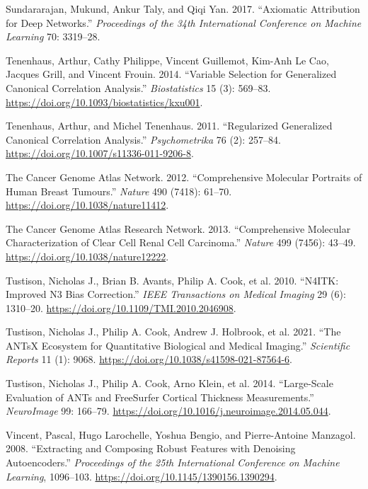 \documentclass[
  10pt,
  letterpaper,
]{report}
\newlength{\cslhangindent}
\newenvironment{CSLReferences}[2] %
 {\begin{list}{}{%
  \setlength{\itemindent}{0pt}
  \setlength{\leftmargin}{0pt}
  \setlength{\parsep}{0pt}
  \ifodd #1
   \setlength{\leftmargin}{\cslhangindent}
   \setlength{\itemindent}{-1\cslhangindent}
  \fi
  \setlength{\itemsep}{#2\baselineskip}}}
 {\end{list}}
\begin{document}
\begin{CSLReferences}{1}{1}
Sundararajan, Mukund, Ankur Taly, and Qiqi Yan. 2017. {``Axiomatic
Attribution for Deep Networks.''} \emph{Proceedings of the 34th
International Conference on Machine Learning} 70: 3319--28.

Tenenhaus, Arthur, Cathy Philippe, Vincent Guillemot, Kim-Anh Le Cao,
Jacques Grill, and Vincent Frouin. 2014. {``Variable Selection for
Generalized Canonical Correlation Analysis.''} \emph{Biostatistics} 15
(3): 569--83. \url{https://doi.org/10.1093/biostatistics/kxu001}.

Tenenhaus, Arthur, and Michel Tenenhaus. 2011. {``Regularized
Generalized Canonical Correlation Analysis.''} \emph{Psychometrika} 76
(2): 257--84. \url{https://doi.org/10.1007/s11336-011-9206-8}.

The Cancer Genome Atlas Network. 2012. {``Comprehensive Molecular
Portraits of Human Breast Tumours.''} \emph{Nature} 490 (7418): 61--70.
\url{https://doi.org/10.1038/nature11412}.

The Cancer Genome Atlas Research Network. 2013. {``Comprehensive
Molecular Characterization of Clear Cell Renal Cell Carcinoma.''}
\emph{Nature} 499 (7456): 43--49.
\url{https://doi.org/10.1038/nature12222}.

Tustison, Nicholas J., Brian B. Avants, Philip A. Cook, et al. 2010.
{``{N4ITK}: Improved {N3} Bias Correction.''} \emph{IEEE Transactions on
Medical Imaging} 29 (6): 1310--20.
\url{https://doi.org/10.1109/TMI.2010.2046908}.

Tustison, Nicholas J., Philip A. Cook, Andrew J. Holbrook, et al. 2021.
{``The {ANTsX} Ecosystem for Quantitative Biological and Medical
Imaging.''} \emph{Scientific Reports} 11 (1): 9068.
\url{https://doi.org/10.1038/s41598-021-87564-6}.

Tustison, Nicholas J., Philip A. Cook, Arno Klein, et al. 2014.
{``Large-Scale Evaluation of {ANTs} and {FreeSurfer} Cortical Thickness
Measurements.''} \emph{NeuroImage} 99: 166--79.
\url{https://doi.org/10.1016/j.neuroimage.2014.05.044}.

Vincent, Pascal, Hugo Larochelle, Yoshua Bengio, and Pierre-Antoine
Manzagol. 2008. {``Extracting and Composing Robust Features with
Denoising Autoencoders.''} \emph{Proceedings of the 25th International
Conference on Machine Learning}, 1096--103.
\url{https://doi.org/10.1145/1390156.1390294}.


\end{CSLReferences}
\end{document}
